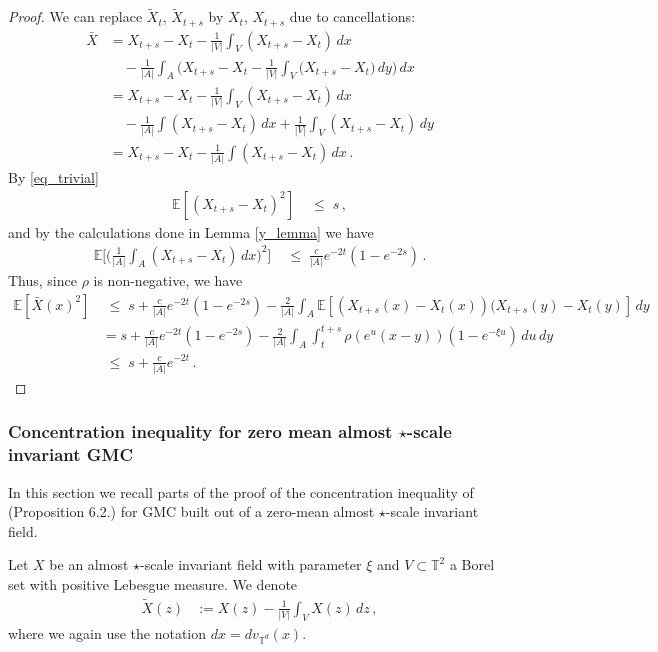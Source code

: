 \documentclass[11pt]{article}
\numberwithin{equation}{section}
\theoremstyle{definition}
\renewcommand{\tilde}{\widetilde}          %
\renewcommand{\leq}{\;\leqslant\;}                   %
\newcommand{\E}{\mathbb{E}}
\def\T{\mathbb{T}}
\newcommand{\ab}{|}
\begin{document}
\begin{proof}
We can replace $\tilde X_t$, $\tilde X_{t+s}$ by $X_t$, $X_{t+s}$ due to cancellations:
\begin{align*}
\bar X &= X_{t+s} - X_t - \frac{1}{\ab V \ab} \int_V (X_{t+s}-X_t ) \, dx \\
& \quad - \frac{1}{\ab A \ab} \int_A \big( X_{t+s} - X_t  - \frac{1}{\ab V \ab} \int _V \big( X_{t+s} - X_t \big) \, dy \big) \, dx \\
&= X_{t+s} - X_t - \frac{1}{\ab V \ab} \int_V (X_{t+s}-X_t ) \, dx \\
& \quad - \frac{1}{\ab A \ab} \int (X_{t+s} - X_t) \, dx  + \frac{1}{\ab V \ab} \int_V (X_{t+s}-X_t) \, dy \\
&= X_{t+s} - X_t - \frac{1}{\ab A \ab} \int (X_{t+s} - X_t) \, dx\,.
\end{align*}
By \eqref{eq_trivial}
\begin{align*}
\E[(X_{t+s}-X_t)^2] &\leq s\,,
\end{align*}
and by the calculations done in Lemma \ref{y_lemma} we have
\begin{align*}
\E\Big[ \big(\tfrac{1}{\ab A \ab} \int_A ( X_{t+s} -  X_t) \, dx  \big)^2 \Big] & \leq \frac{c}{\ab A \ab} e^{-2t}(1-e^{-2s})\,.
\end{align*}
Thus, since $\rho$ is non-negative, we have 
\begin{align*}
\E [\bar X(x)^2] & \leq s + \frac{c}{\ab A \ab} e^{-2t}(1-e^{-2s}) - \frac{2}{\ab A \ab} \int_A \E[(X_{t+s}(x)-X_t(x))( X_{t+s}(y) - X_t(y)]\, dy  \\
&= s + \frac{c}{\ab A \ab} e^{-2t}(1-e^{-2s}) - \frac{2}{\ab A \ab} \int_A \int_t^{t+s} \rho(e^u( x-y ))(1-e^{-\xi u}) \, du \, dy \\
& \leq  s + \frac{c}{\ab A \ab}  e^{-2t}\,.
\end{align*}
\end{proof}



\subsubsection{Concentration inequality for zero mean almost $\star$-scale invariant GMC}

In this section we recall parts of the proof of the concentration inequality of \cite{LRV} (Proposition 6.2.) for GMC built out of a zero-mean almost $\star$-scale invariant field.

Let $X$ be an almost $\star$-scale invariant field with parameter $\xi$ and $V \subset \T^2$ a Borel set with positive Lebesgue measure. We denote 
\begin{align*}
\tilde X(z) &:= X(z) - \frac{1}{\ab V \ab} \int_V X(z) \, dz \,,
\end{align*}
where we again use the notation $dx = dv_{\T^d}(x)$.
\end{document}
